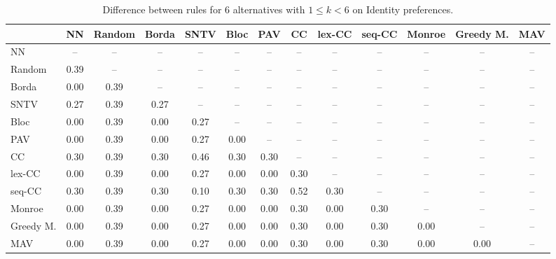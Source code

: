 
\begin{table*}[htbp]
\centering
\begin{tabular}{lcccccccccccc}
\toprule
 & NN & Random & Borda & SNTV & Bloc & PAV & CC & lex-CC & seq-CC & Monroe & Greedy M. & MAV \\
\midrule
NN & -- & -- & -- & -- & -- & -- & -- & -- & -- & -- & -- & -- \\
Random & \cellcolor{blue!39} 0.39 & -- & -- & -- & -- & -- & -- & -- & -- & -- & -- & -- \\
Borda & \cellcolor{blue!0} 0.00 & \cellcolor{blue!39} 0.39 & -- & -- & -- & -- & -- & -- & -- & -- & -- & -- \\
SNTV & \cellcolor{blue!27} 0.27 & \cellcolor{blue!39} 0.39 & \cellcolor{blue!27} 0.27 & -- & -- & -- & -- & -- & -- & -- & -- & -- \\
Bloc & \cellcolor{blue!0} 0.00 & \cellcolor{blue!39} 0.39 & \cellcolor{blue!0} 0.00 & \cellcolor{blue!27} 0.27 & -- & -- & -- & -- & -- & -- & -- & -- \\
PAV & \cellcolor{blue!0} 0.00 & \cellcolor{blue!39} 0.39 & \cellcolor{blue!0} 0.00 & \cellcolor{blue!27} 0.27 & \cellcolor{blue!0} 0.00 & -- & -- & -- & -- & -- & -- & -- \\
CC & \cellcolor{blue!30} 0.30 & \cellcolor{blue!39} 0.39 & \cellcolor{blue!30} 0.30 & \cellcolor{blue!46} 0.46 & \cellcolor{blue!30} 0.30 & \cellcolor{blue!30} 0.30 & -- & -- & -- & -- & -- & -- \\
lex-CC & \cellcolor{blue!0} 0.00 & \cellcolor{blue!39} 0.39 & \cellcolor{blue!0} 0.00 & \cellcolor{blue!27} 0.27 & \cellcolor{blue!0} 0.00 & \cellcolor{blue!0} 0.00 & \cellcolor{blue!30} 0.30 & -- & -- & -- & -- & -- \\
seq-CC & \cellcolor{blue!30} 0.30 & \cellcolor{blue!39} 0.39 & \cellcolor{blue!30} 0.30 & \cellcolor{blue!10} 0.10 & \cellcolor{blue!30} 0.30 & \cellcolor{blue!30} 0.30 & \cellcolor{blue!52} 0.52 & \cellcolor{blue!30} 0.30 & -- & -- & -- & -- \\
Monroe & \cellcolor{blue!0} 0.00 & \cellcolor{blue!39} 0.39 & \cellcolor{blue!0} 0.00 & \cellcolor{blue!27} 0.27 & \cellcolor{blue!0} 0.00 & \cellcolor{blue!0} 0.00 & \cellcolor{blue!30} 0.30 & \cellcolor{blue!0} 0.00 & \cellcolor{blue!30} 0.30 & -- & -- & -- \\
Greedy M. & \cellcolor{blue!0} 0.00 & \cellcolor{blue!39} 0.39 & \cellcolor{blue!0} 0.00 & \cellcolor{blue!27} 0.27 & \cellcolor{blue!0} 0.00 & \cellcolor{blue!0} 0.00 & \cellcolor{blue!30} 0.30 & \cellcolor{blue!0} 0.00 & \cellcolor{blue!30} 0.30 & \cellcolor{blue!0} 0.00 & -- & -- \\
MAV & \cellcolor{blue!0} 0.00 & \cellcolor{blue!39} 0.39 & \cellcolor{blue!0} 0.00 & \cellcolor{blue!27} 0.27 & \cellcolor{blue!0} 0.00 & \cellcolor{blue!0} 0.00 & \cellcolor{blue!30} 0.30 & \cellcolor{blue!0} 0.00 & \cellcolor{blue!30} 0.30 & \cellcolor{blue!0} 0.00 & \cellcolor{blue!0} 0.00 & -- \\
\bottomrule
\end{tabular}

\caption{Difference between rules for 6 alternatives with $1 \leq k < 6$ on Identity preferences.}
\label{tab:rule_distance_heatmap-m=[6]-pref_dist=identity}
\end{table*}
    